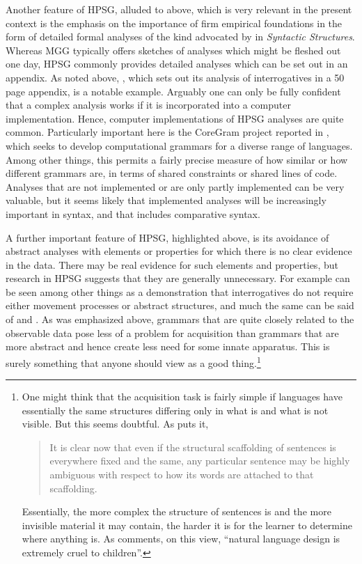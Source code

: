 \documentclass[output=paper]{langsci/langscibook}
\begin{document}
Another feature of \gls{HPSG}, alluded to above, which is very relevant in the
present context is the emphasis on the importance of firm empirical foundations
in the form of detailed formal analyses of the kind advocated by
\citeauthor{Chomsky1957} in \emph{Syntactic Structures}. Whereas \gls{MGG}
typically offers sketches of analyses which might be fleshed out one day,
\gls{HPSG} commonly provides detailed analyses which can be set out in an
appendix. As noted above, \citet{GinSag2000}, which sets out its analysis of
 interrogatives in a 50 page appendix, is a notable example.
Arguably one can only be fully confident that a complex analysis works if it is
incorporated into a computer implementation. Hence, computer implementations of
\gls{HPSG} analyses are quite common. Particularly important here is the
CoreGram project reported in \citet{Muller2015}, which seeks to develop
computational grammars for a diverse range of languages. Among other things,
this permits a fairly precise measure of how similar or how different grammars
are, in terms of shared constraints or shared lines of code. Analyses that are
not implemented or are only partly implemented can be very valuable, but it
seems likely that implemented analyses will be increasingly important in
syntax, and that includes comparative syntax.

A further important feature of \gls{HPSG}, highlighted above, is its avoidance
of abstract analyses with elements or properties for which there is no clear
evidence in the data. There may be real evidence for such elements and
properties, but research in \gls{HPSG} suggests that they are generally
unnecessary.  For example \citet{GinSag2000} can be seen among other things as
a demonstration that  interrogatives do not require either
movement processes or abstract structures, and much the same can be said of
\citet{Sag1997} and  . As was emphasized above,
grammars that are quite closely related to the observable data pose less
of a problem for acquisition than grammars that are more abstract and hence
create less need for some innate apparatus. This is surely something that
anyone should view as a good thing.\footnote{One might think that the acquisition
    task is fairly simple if languages have essentially the same structures
    differing only in what is and what is not visible. But this seems doubtful.
    As \citet[765]{Fodor2001} puts it, \blockquote{It is clear now that even if
        the structural scaffolding of sentences is everywhere fixed and the
        same, any particular sentence may be highly ambiguous with respect to
        how its words are attached to that scaffolding.} Essentially, the more
        complex the structure of sentences is and the more invisible material
    it may contain, the harder it is for the learner to determine where
anything is. As \citet[763]{Fodor2001} comments, on this view, \enquote{natural
language design is extremely cruel to children}.}
\end{document}
